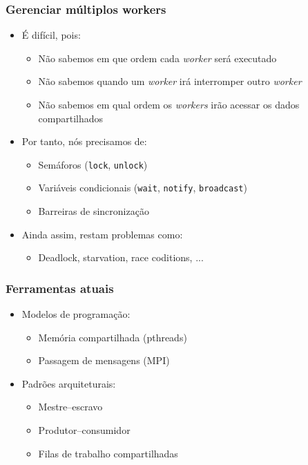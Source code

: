\documentclass[Ligatures=TeX,table,brazil,svgnames,usetotalslideindicator,comp
ress,10pt]{beamer}
\begin{document}
\begin{frame}
  \frametitle{Gerenciar múltiplos workers}

  \begin{itemize}
  \item É difícil, pois:
    \begin{itemize}
    \item Não sabemos em que ordem cada \textit{worker} será executado
    \item Não sabemos quando um \textit{worker} irá interromper outro \textit{worker}
    \item Não sabemos em qual ordem os \textit{workers} irão acessar
      os dados compartilhados
    \end{itemize}
  \item Por tanto, nós precisamos de:
    \begin{itemize}
    \item Semáforos (\texttt{lock}, \texttt{unlock})
    \item Variáveis condicionais (\texttt{wait}, \texttt{notify}, \texttt{broadcast})
    \item Barreiras de sincronização
    \end{itemize}
  \item Ainda assim, restam problemas como:
    \begin{itemize}
    \item Deadlock, starvation, race coditions, ...
    \end{itemize}
  \end{itemize}

\end{frame}

\begin{frame}
  \frametitle{Ferramentas atuais}
  \begin{itemize}
  \item Modelos de programação:
    \begin{itemize}
    \item Memória compartilhada (pthreads)
    \item Passagem de mensagens (MPI)
    \end{itemize}
  \item Padrões arquiteturais:
    \begin{itemize}
    \item Mestre--escravo
    \item Produtor--consumidor
    \item Filas de trabalho compartilhadas
    \end{itemize}
  \end{itemize}
\end{frame}
\end{document}
